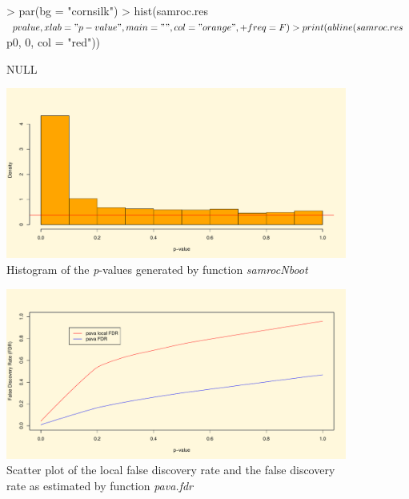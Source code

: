 \documentclass[a4paper]{article}
\begin{document}
\begin{figure}[htbp]
\centering

\begin{Schunk}
\begin{Sinput}
> par(bg = "cornsilk")
> hist(samroc.res$pvalue, xlab = "p-value", main = "", col = "orange", 
+     freq = F)
> print(abline(samroc.res$p0, 0, col = "red"))
\end{Sinput}
\begin{Soutput}
NULL
\end{Soutput}
\end{Schunk}
\includegraphics{samroc-ex-002}
\caption{Histogram of the \textit{p}-values generated by function \textit{samrocNboot}}
\label{hist1}
\end{figure}

\begin{figure}[htbp]
\centering
\begin{Schunk}
\end{Schunk}
\includegraphics{samroc-ex-003}
\caption{Scatter plot of the local false discovery rate and the false discovery rate as estimated by function \textit{pava.fdr}}
\label{hist2}
\end{figure}

\newpage


\end{document}
